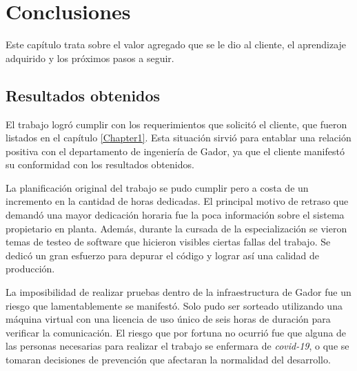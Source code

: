 
\chapter{Conclusiones} %

\label{Chapter5} %




Este capítulo trata sobre el valor agregado que se le dio al cliente, el aprendizaje adquirido y los próximos pasos a seguir.

\section{Resultados obtenidos}

El trabajo logró cumplir con los requerimientos que solicitó el cliente, que fueron listados en el capítulo \ref{Chapter1}.
Esta situación sirvió para entablar una relación positiva con el departamento de ingeniería de Gador, ya que el cliente manifestó su conformidad con los resultados obtenidos.

La planificación original del trabajo se pudo cumplir pero a costa de un incremento en la cantidad de horas dedicadas.
El principal motivo de retraso que demandó una mayor dedicación horaria fue la poca información sobre el sistema propietario en planta.
Además, durante la cursada de la especialización se vieron temas de testeo de software que hicieron visibles ciertas fallas del trabajo.
Se dedicó un gran esfuerzo para depurar el código y lograr así una calidad de producción.

La imposibilidad de realizar pruebas dentro de la infraestructura de Gador fue un riesgo que lamentablemente se manifestó.
Solo pudo ser sorteado utilizando una máquina virtual con una licencia de uso único de seis horas de duración para verificar la comunicación.
El riesgo que por fortuna no ocurrió fue que alguna de las personas necesarias para realizar el trabajo se enfermara de \emph{covid-19}, o que se tomaran decisiones de prevención que afectaran la normalidad del desarrollo.

